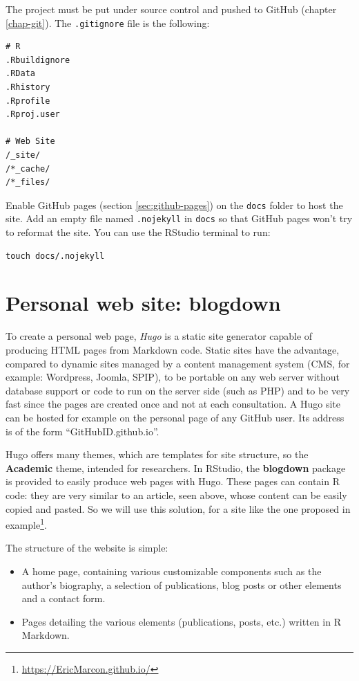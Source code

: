 \documentclass[
  12pt,
  american,
  a4paper,
  extrafontsizes,onecolumn,openright
  ]{memoir}
\providecommand{\tightlist}{%
  \setlength{\itemsep}{0pt}\setlength{\parskip}{0pt}}
\begin{document}
The project must be put under source control and pushed to GitHub (chapter \ref{chap-git}).
The \texttt{.gitignore} file is the following:

\begin{verbatim}
# R
.Rbuildignore
.RData
.Rhistory
.Rprofile
.Rproj.user

# Web Site
/_site/
/*_cache/
/*_files/
\end{verbatim}

Enable GitHub pages (section \ref{sec:github-pages}) on the \texttt{docs} folder to host the site.
Add an empty file named \texttt{.nojekyll} in \texttt{docs} so that GitHub pages won't try to reformat the site.
You can use the RStudio terminal to run:

\begin{verbatim}
touch docs/.nojekyll
\end{verbatim}

\section{Personal web site: blogdown}\label{sec:blogdown}

To create a personal web page, \emph{Hugo} is a static site generator capable of producing HTML pages from Markdown code.
Static sites have the advantage, compared to dynamic sites managed by a content management system (CMS, for example: Wordpress, Joomla, SPIP), to be portable on any web server without database support or code to run on the server side (such as PHP) and to be very fast since the pages are created once and not at each consultation.
A Hugo site can be hosted for example on the personal page of any GitHub user.
Its address is of the form \enquote{GitHubID.github.io}.

Hugo offers many themes, which are templates for site structure, so the \textbf{Academic} theme, intended for researchers.
In RStudio, the \textbf{blogdown} package is provided to easily produce web pages with Hugo.
These pages can contain R code: they are very similar to an article, seen above, whose content can be easily copied and pasted.
So we will use this solution, for a site like the one proposed in example\footnote{\url{https://EricMarcon.github.io/}}.

The structure of the website is simple:

\begin{itemize}
\tightlist
\item
  A home page, containing various customizable components such as the author's biography, a selection of publications, blog posts or other elements and a contact form.
\item
  Pages detailing the various elements (publications, posts, etc.) written in R Markdown.
\end{itemize}
\end{document}
